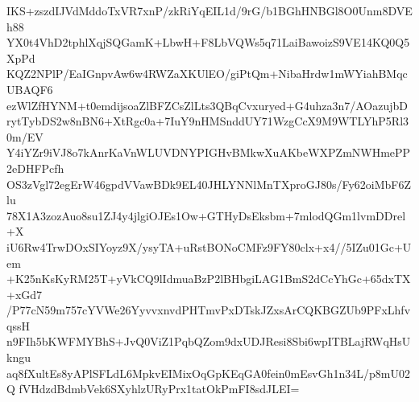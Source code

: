 IKS+zszdIJVdMddoTxVR7xnP/zkRiYqEIL1d/9rG/b1BGhHNBGl8O0Unm8DVEh88
YX0t4VhD2tphlXqjSQGamK+LbwH+F8LbVQWs5q71LaiBawoizS9VE14KQ0Q5XpPd
KQZ2NPlP/EaIGnpvAw6w4RWZaXKUlEO/giPtQm+NibaHrdw1mWYiahBMqcUBAQF6
ezWlZfHYNM+t0emdijsoaZlBFZCsZlLts3QBqCvxuryed+G4uhza3n7/AOazujbD
rytTybDS2w8nBN6+XtRgc0a+7IuY9nHMSnddUY71WzgCcX9M9WTLYhP5Rl30m/EV
Y4iYZr9iVJ8o7kAnrKaVnWLUVDNYPIGHvBMkwXuAKbeWXPZmNWHmePP2eDHFPcfh
OS3zVgl72egErW46gpdVVawBDk9EL40JHLYNNlMnTXproGJ80s/Fy62oiMbF6Zlu
78X1A3zozAuo8su1ZJ4y4jlgiOJEs1Ow+GTHyDsEksbm+7mlodQGm1lvmDDrel+X
iU6Rw4TrwDOxSIYoyz9X/ysyTA+uRstBONoCMFz9FY80clx+x4//5IZu01Gc+Uem
+K25nKsKyRM25T+yVkCQ9lIdmuaBzP2lBHbgiLAG1BmS2dCcYhGc+65dxTX+xGd7
/P77cN59m757cYVWe26YyvvxnvdPHTmvPxDTskJZxsArCQKBGZUb9PFxLhfvqssH
n9FIh5bKWFMYBhS+JvQ0ViZ1PqbQZom9dxUDJResi8Sbi6wpITBLajRWqHsUkngu
aq8fXultEs8yAPlSFLdL6MpkvEIMixOqGpKEqGA0fein0mEsvGh1n34L/p8mU02Q
fVHdzdBdmbVek6SXyhlzURyPrx1tatOkPmFI8sdJLEI=
